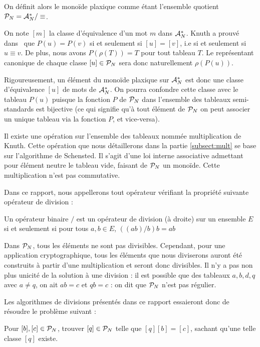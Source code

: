 \medskip
\begin{definition} \label{def:monoide_plaxique}
  On définit alors le monoïde plaxique comme étant l'ensemble quotient $\P=\A/\equiv$. 
\end{definition}
On note $[m]$ la classe d'équivalence d'un mot $m$ dans $\A$. Knuth a prouvé dans~\cite{knuth1970permutations} que $P(u)=P(v)$ si et seulement si $[u]=[v]$, i.e si et seulement si $u \equiv v$. De plus, nous avons $P(\rho(T))=T$ pour tout tableau $T$. Le représentant canonique de chaque classe $[u] \in \P$ sera donc naturellement $\rho(P(u))$.

Rigoureusement, un élément du monoïde plaxique sur $\A$ est donc une classe d'équivalence $[u]$ de mots de $\A$. On pourra confondre cette classe avec le tableau $P(u)$ puisque la fonction $P$ de $\P$ dans l'ensemble des tableaux semi-standards est bijective (ce qui signifie qu'à tout élément de $\P$ on peut associer un unique tableau via la fonction $P$, et vice-versa).

Il existe une opération sur l'ensemble des tableaux nommée multiplication de Knuth. Cette opération que nous détaillerons dans la partie \ref{subsect:mult} se base sur l'algorithme de Schensted. Il s'agit d'une loi interne associative admettant pour élément neutre le tableau vide, faisant de $\P$ un monoïde. Cette multiplication n'est pas commutative.

Dans ce rapport, nous appellerons tout opérateur vérifiant la propriété suivante opérateur de division : 
\begin{definition}[division]
  Un opérateur binaire $/$ est un opérateur de division (à droite) sur un ensemble $E$ si et seulement si pour tous $a,b \in E$, $((ab)/b)b=ab$
\end{definition}

Dans $\P$, tous les éléments ne sont pas divisibles. Cependant, pour une application cryptographique, tous les éléments que nous diviserons auront été construits à partir d'une multiplication et seront donc divisibles. Il n'y a pas non plus unicité de la solution à une division : il est possible que des tableaux $a,b,d,q$  avec $a \neq q$, on ait $ab=c$ et $qb=c$ : on dit que $\P$ n'est pas régulier.

Les algorithmes de divisions présentés dans ce rapport essaieront donc de résoudre le problème suivant : 
\begin{problem} \label{prob:div}
  Pour $[b], [c] \in \P$, trouver $[q] \in \P$ telle que $[q][b]=[c]$, sachant qu'une telle classe $[q]$ existe.
\end{problem}

